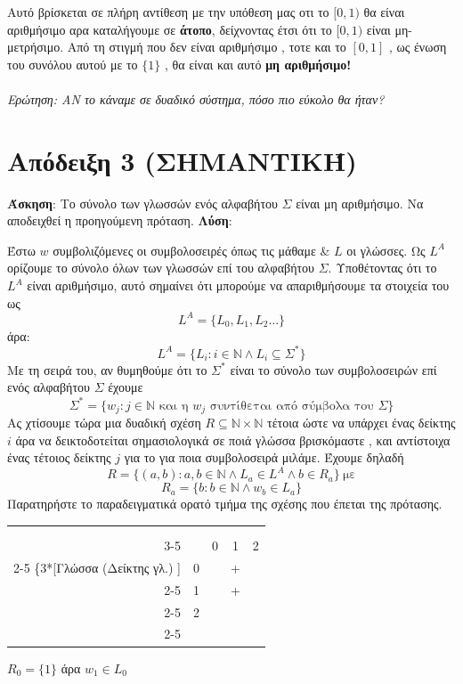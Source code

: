 \documentclass[]{article}
\begin{document}
Αυτό βρίσκεται σε πλήρη αντίθεση με την υπόθεση μας οτι το $[0,1)$ θα είναι αριθμήσιμο αρα καταλήγουμε σε \textbf{άτοπο}, δείχνοντας έτσι ότι το $[0,1)$ είναι μη-μετρήσιμο. Από τη στιγμή που δεν είναι αριθμήσιμο , τοτε και το $[0,1]$ , ως ένωση του συνόλου αυτού με το $\{1\}$ , θα είναι και αυτό \textbf{μη αριθμήσιμο!} 
\\~\\
\textit{Ερώτηση: ΑΝ το κάναμε σε δυαδικό σύστημα, πόσο πιο εύκολο θα ήταν?}
\pagebreak
\section{Απόδειξη 3 (ΣΗΜΑΝΤΙΚΉ)}
\textbf{Άσκηση}:  Το σύνολο των γλωσσών ενός αλφαβήτου $\Sigma$ είναι μη αριθμήσιμο. Να αποδειχθεί η προηγούμενη πρόταση.
\textbf{Λύση}: 

Έστω $w$ συμβολιζόμενες οι συμβολοσειρές όπως τις μάθαμε \& $L$ οι γλώσσες. Ως $L^A$ ορίζουμε το σύνολο όλων των γλωσσών επί του αλφαβήτου $\Sigma$. Υποθέτοντας ότι το $L^A$ είναι αριθμήσιμο, αυτό σημαίνει ότι μπορούμε να απαριθμήσουμε τα στοιχεία του ως
$$L^A = \{L_0, L_1, L_2 \dots\}$$ άρα:
\begin{equation*}
	L^A = \{L_i : i \in \mathbb{N} \land L_i \subseteq \Sigma^*\}
\end{equation*}
Με τη σειρά του, αν θυμηθούμε ότι το $\Sigma^*$ είναι το σύνολο των συμβολοσειρών επί ενός αλφαβήτου $\Sigma$ έχουμε
\begin{equation*}
\Sigma^* = \{w_j : j \in \mathbb{N} \text{ και η } w_j \text{ συντίθεται από σύμβολα του } \Sigma\}
\end{equation*}
Ας χτίσουμε τώρα μια δυαδική σχέση $R \subseteq \mathbb{N} \times \mathbb{N}$ τέτοια ώστε να υπάρχει ένας δείκτης $i$ άρα να δεικτοδοτείται σημασιολογικά σε ποιά γλώσσα βρισκόμαστε , και αντίστοιχα ένας τέτοιος δείκτης $j$ για το για ποια συμβολοσειρά μιλάμε. Έχουμε δηλαδή
$$R = \{(a,b) : a,b \in \mathbb{N} \land L_a \in L^A \land b \in R_a\} ~ \text{με} $$
$$R_a = \{b : b \in \mathbb{N} \land w_b \in L_a\}$$
Παρατηρήστε το παραδειγματικά ορατό τμήμα της σχέσης που έπεται της πρότασης.
\begin{center}
	\begin{tabular}{rl|c|c|c|}
		\multicolumn{2}{c}{} & \multicolumn{3}{c}{\makebox[0pt]{\footnotesize Συμβολοσειρά (Δείκτης συμ/σειράς)}} \\[-1ex]
		\multicolumn{2}{c}{} & \multicolumn{3}{c}{\downbracefill} \\
		\cline{3-5}
		& & 0 & 1 & 2 \\ \cline{2-5}
		\ldelim\{{3}{*}[{\footnotesize Γλώσσα (Δείκτης γλ.) }] & \multicolumn{1}{|l|}{0} &   & + &   \\ \cline{2-5}
		& \multicolumn{1}{|l|}{1} &   & + &   \\ \cline{2-5}
		& \multicolumn{1}{|l|}{2} &   &   &   \\ \cline{2-5}
	\end{tabular}
	\quad $R_0 = \{1\}$ άρα $w_1 \in L_0$
\end{center}
\end{document}
